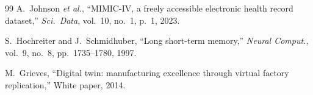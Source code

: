 \documentclass[conference]{IEEEtran}
\begin{document}
\begin{thebibliography}{99}
A.\ Johnson \emph{et al.},
``MIMIC-IV, a freely accessible electronic health record dataset,''
\emph{Sci.\ Data}, vol.~10, no.~1, p.~1, 2023.

S.\ Hochreiter and J.\ Schmidhuber,
``Long short-term memory,''
\emph{Neural Comput.}, vol.~9, no.~8, pp.~1735--1780, 1997.

M.\ Grieves,
``Digital twin: manufacturing excellence through virtual factory replication,''
White paper, 2014.

\end{thebibliography}
\end{document}

